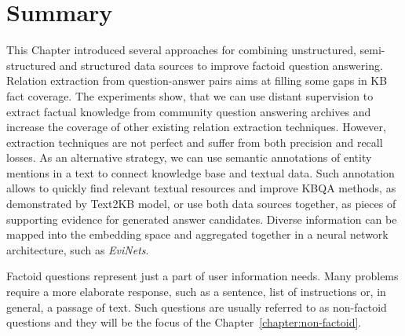 
\section{Summary}
\label{section:factoid:summary}

This Chapter introduced several approaches for combining unstructured, semi-structured and structured data sources to improve factoid question answering.
Relation extraction from question-answer pairs aims at filling some gaps in KB fact coverage.
The experiments show, that we can use distant supervision to extract factual knowledge from community question answering archives and increase the coverage of other existing relation extraction techniques.
However, extraction techniques are not perfect and suffer from both precision and recall losses.
As an alternative strategy, we can use semantic annotations of entity mentions in a text to connect knowledge base and textual data.
Such annotation allows to quickly find relevant textual resources and improve KBQA methods, as demonstrated by Text2KB model, or use both data sources together, as pieces of supporting evidence for generated answer candidates.
Diverse information can be mapped into the embedding space and aggregated together in a neural network architecture, such as \textit{EviNets}.

Factoid questions represent just a part of user information needs. Many problems require a more elaborate response, such as a sentence, list of instructions or, in general, a passage of text.
Such questions are usually referred to as non-factoid questions and they will be the focus of the Chapter~\ref{chapter:non-factoid}.




